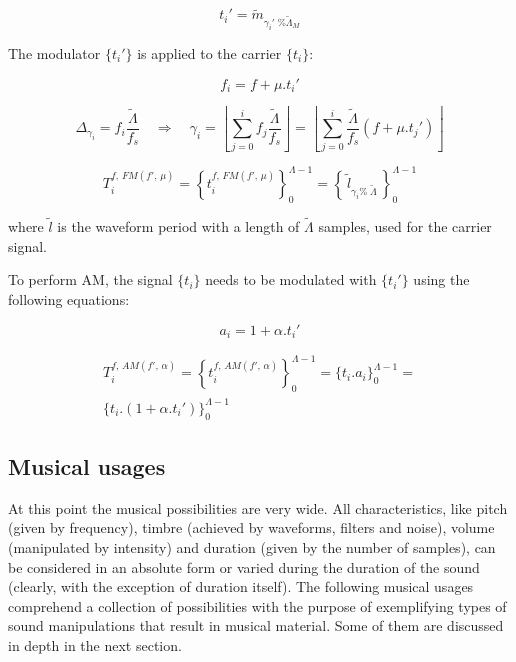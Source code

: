 \begin{equation}\label{fmAux}
t_i'=\widetilde{m}_{\gamma_i' \;\% \widetilde{\Lambda}_M}
\end{equation}

The modulator $\{t_i'\}$ is applied to the carrier $\{t_i\}$:

\begin{equation}\label{fmF}
f_i=f + \mu . t_i'
\end{equation}

\begin{equation}\label{fmGamma}
\Delta_{\gamma_i}=f_i\frac{\widetilde{\Lambda}}{f_s} \quad \Rightarrow \quad \gamma_i = \left \lfloor \sum_{j=0}^{i} f_j \frac{\widetilde{\Lambda}}{f_s} \right \rfloor = \left \lfloor \sum_{j=0}^{i} \frac{\widetilde{\Lambda}}{f_s}(f+\mu . t_j') \right\rfloor
\end{equation}

\begin{equation}\label{fmT}
T_i^{f,\, FM(f',\,\mu)}=\left\{ t_i^{f,\,FM(f',\,\mu)} \right\}_0^{\Lambda-1}=\left\{\,\widetilde{l}_{\gamma_i \%\; \widetilde{\Lambda} } \,\right\}_0^{\Lambda-1}
\end{equation}


\noindent where $\widetilde{l}$ is the waveform period with a length of $\widetilde{\Lambda}$ samples, used for the carrier signal.

To perform AM, the signal $\{t_i\}$ needs to be modulated with $\{t_i'\}$ using the following equations:

\begin{equation}\label{amA}
a_i=1 + \alpha . t_i'
\end{equation}

\begin{multline}\label{amT}
T_i^{f,\,AM(f',\,\alpha)}=\left\{ t_i^{f,\,AM(f',\,\alpha)} \right\}_0^{\Lambda-1}=\{ t_i . a_i \}_0^{\Lambda-1}= \\ \{t_i . (1 + \alpha . t_i')    \}_0^{\Lambda-1}
\end{multline}

\subsection{Musical usages}\label{subsec:mus2}
At this point the musical possibilities are very wide. All characteristics, like pitch (given by frequency), timbre (achieved by waveforms, filters and noise), volume (manipulated by intensity) and duration (given by the number of samples), can be considered in an absolute form or varied during the duration of the sound (clearly, with the exception of duration itself). The following musical usages comprehend a collection of possibilities with the purpose of exemplifying types of sound manipulations that result in musical material. Some of them are discussed in depth in the next section.

